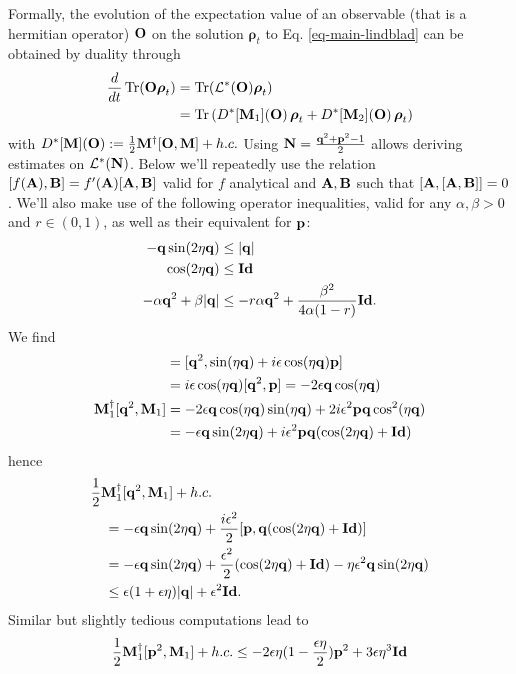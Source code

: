 \documentclass[a4paper, 11pt]{article}
\newcommand{\orho}{{\boldsymbol \rho}}
\newcommand{\oA}{{\bf A}}
\newcommand{\oB}{{\bf B}}
\newcommand{\oN}{{\bf N}}
\newcommand{\oM}{{\bf M}}
\newcommand{\oO}{{\bf O}}
\newcommand{\oq}{{\bf q}}
\newcommand{\op}{{\bf p}}
\newcommand{\oid}{{\bf Id}}
\DeclareMathOperator{\tr}{Tr}
\begin{document}
Formally, the evolution of the expectation value of an observable (that is a hermitian operator) $\oO$ on the solution $\orho_t$ to Eq. \eqref{eq-main-lindblad} can be obtained by duality through
\begin{align}
    \frac{d}{dt}\tr(\oO\orho_t) &= \tr(\mathcal L^*(\oO)\orho_t)\\
    &=\tr\left( D^*[\oM_1](\oO) \, \orho_t + D^*[\oM_2] (\oO)\,  \orho_t \right)
\end{align}
with $D^*[\oM](\oO) := \frac12\oM^\dag [\oO,\oM] + h.c.$
Using $\oN = \frac{\oq^2+\op^2-1}{2}$ allows deriving estimates on $\mathcal L^*(\oN)$. Below we'll repeatedly use the relation $[f(\oA),\oB] = f'(\oA) [\oA,\oB]$ valid for $f$ analytical and $\oA,\oB$ such that $[\oA, [\oA,\oB]] = 0$.  We'll also make use of the following operator inequalities, valid for any $\alpha,\beta>0$ and $r\in (0,1)$,
as well as their equivalent for $\op$:
\begin{align}
    -\oq \sin(2\eta \oq) &\leq |\oq|\\
    \cos(2\eta\oq) &\leq \oid\\
    -\alpha \oq^2 + \beta |\oq| &\leq -r\alpha\oq^2 + \frac{\beta^2}{4\alpha(1-r)}\oid. \label{eq-rtrick}
\end{align}
We find
\begin{align}
    [\oq^2, \oM_1] &= [\oq^2, \sin(\eta\oq) + i\epsilon\cos(\eta \oq) \op]\\
    &= i\epsilon\cos(\eta \oq) [\oq^2, \op] = -2\epsilon \oq \cos(\eta \oq)\\
    \oM_1^\dagger [\oq^2,\oM_1] &=
        -2\epsilon \oq\cos(\eta\oq)\sin(\eta\oq) +2 i\epsilon^2\op\oq\cos^2(\eta \oq)\\
        &= -\epsilon \oq\sin(2\eta\oq) + i\epsilon^2\op\oq(\cos(2\eta\oq) +\oid) 
\end{align}
hence
\begin{align}
    &\frac12 \oM_1^\dagger [\oq^2,\oM_1] + h.c.
     \notag\\
    &\quad = -\epsilon \oq\sin(2\eta\oq) + \frac {i\epsilon^2}2[\op,\oq(\cos(2\eta\oq)+\oid)]\\
    &\quad = -\epsilon \oq\sin(2\eta\oq) + \frac{\epsilon^2}2 (\cos(2\eta\oq)+\oid) - \eta \epsilon^2 \oq \sin(2\eta\oq)\\
    &\quad \leq \epsilon(1+\epsilon\eta) |\oq| + \epsilon^2\oid.
\end{align}
Similar but slightly tedious computations lead to
\begin{align}
    \frac12 \oM_1^\dag [\op^2, \oM_1] + h.c.
    \leq -2\epsilon\eta (1-\frac{\epsilon\eta}{2})\op^2 +3\epsilon\eta^3 \oid
\end{align}
\end{document}
